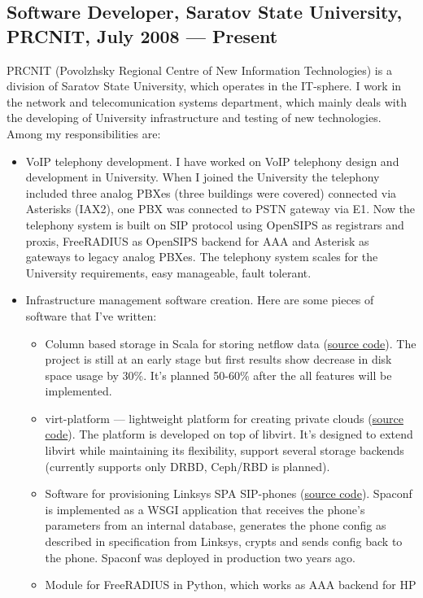 \documentclass[a4paper,10pt]{article}
\begin{document}
\subsection{Software Developer, Saratov State University, PRCNIT, July 2008 ---
Present}
PRCNIT (Povolzhsky Regional Centre of New Information Technologies) is a division
of Saratov State University, which operates in the IT-sphere. I work in the
network and telecomunication systems department, which mainly deals with
the developing of University infrastructure and testing of new technologies. Among
my responsibilities are:
\begin{itemize}
\item VoIP telephony development. I have worked on VoIP telephony design and
development in University. When I joined the University the telephony included
three analog PBXes (three buildings were covered) connected via Asterisks (IAX2),
one PBX was connected to PSTN gateway via E1. Now the telephony system is built on
SIP protocol using OpenSIPS as registrars and proxis, FreeRADIUS as OpenSIPS
backend for AAA and Asterisk as gateways to legacy analog PBXes. The telephony
system scales for the University requirements, easy manageable, fault tolerant.
\item Infrastructure management software creation. Here are some pieces of
software that I've written:
 \begin{itemize}
 \item Column based storage in Scala for storing netflow data
(\href{http://github.com/ivaxer/cbs}{source code}). The project is still at an
early stage but first results show decrease in disk space usage by 30\%. It's
planned 50-60\% after the all features will be implemented.
 \item virt-platform --- lightweight platform for creating private clouds
(\href{http://git.sgu.ru/?p=virt-platform.git;a=summary}{source code}).
The platform is developed on top of libvirt. It's designed to extend libvirt
while maintaining its flexibility, support several storage backends (currently
supports only DRBD, Ceph\slash RBD is planned).
 \item Software for provisioning Linksys SPA SIP-phones
(\href{http://git.sgu.ru/?p=spaconf.git;a=summary}{source code}). Spaconf is
implemented as a WSGI application that receives the phone's
parameters from an internal database, generates the phone config as described in
specification from Linksys, crypts and sends config back to the phone.  Spaconf
was deployed in production two years ago.
 \item Module for FreeRADIUS in Python, which works as AAA backend for HP

\end{itemize}
\end{itemize}
\end{document}
